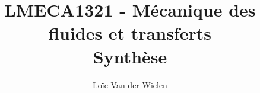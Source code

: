 \documentclass[a4paper,11pt]{report}
\title{LMECA1321 - Mécanique des fluides et transferts\\Synthèse}
\author{Loïc Van der Wielen}
\begin{document}
\maketitle
\tableofcontents




\begin{appendix}
  
\end{appendix}
\end{document}
